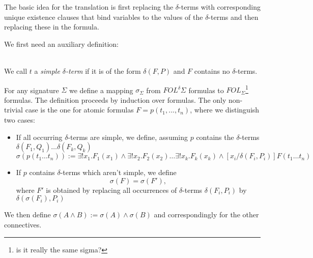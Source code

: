 \documentclass{article}
\begin{document}
The basic idea for the translation is first replacing the $\delta$-terms with corresponding unique existence clauses that bind variables to the values of the $\delta$-terms and then replacing these in the formula.

We first need an auxiliary definition:
\begin{definition}\ \\
We call $t$ a \textit{simple $\delta$-term} if it is of the form $\delta(F,P)$ and $F$ contains no $\delta$-terms.
\end{definition}
  
\begin{definition} 
For any signature $\Sigma$ we define a mapping $\sigma_\Sigma$ from $FOL^\delta\Sigma$ formulas to $FOL_\Sigma$\footnote{is it really the same sigma?} formulas. The definition proceeds by induction over formulas. The only non-trivial case is the one for atomic formulas $F=p(t_1,..., t_n)$, where we distinguish two cases:

\begin{itemize}
\item If all occurring $\delta$-terms are simple, we define, assuming $p$ contains the $\delta$-terms $\delta(F_1,Q_1)\dots \delta(F_k,Q_k)$
\[
\sigma(p(t_1\dots t_n)):= \exists!x_1.F_1(x_1)\wedge \exists!x_2.F_2(x_2)\dots \exists!x_k.F_k(x_k)\wedge [x_i/\delta(F_i,P_i)]F(t_1\dots t_n)
\]

\item If $p$ contains $\delta$-terms which aren't simple, we define 
\[
\sigma(F)=\sigma(F'),\] 
where $F'$ is obtained by replacing all occurrences of $\delta$-terms $\delta(F_i,P_i)$ by $\delta(\sigma(F_i),P_i)$
\end{itemize}
We then define $\sigma(A\wedge B) := \sigma(A)\wedge \sigma(B)$ and correspondingly for the other connectives.\\

\end{definition}
\end{document}

